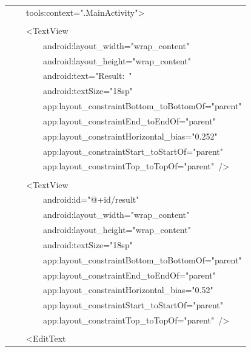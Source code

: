 \documentclass[a4paper,12pt]{article}
\begin{document}
\begin{longtable}{|p{}|}
{\ttfamily\small \ \ \ \ tools:context=".MainActivity"\textgreater{}} \\
\strut \\
{\ttfamily\small \ \ \ \ \textless{}TextView} \\
{\ttfamily\small \ \ \ \ \ \ \ \ android:layout\_width="wrap\_content"} \\
{\ttfamily\small \ \ \ \ \ \ \ \ android:layout\_height="wrap\_content"} \\
{\ttfamily\small \ \ \ \ \ \ \ \ android:text="Result:\ "} \\
{\ttfamily\small \ \ \ \ \ \ \ \ android:textSize="18sp"} \\
{\ttfamily\small \ \ \ \ \ \ \ \ app:layout\_constraintBottom\_toBottomOf="parent"} \\
{\ttfamily\small \ \ \ \ \ \ \ \ app:layout\_constraintEnd\_toEndOf="parent"} \\
{\ttfamily\small \ \ \ \ \ \ \ \ app:layout\_constraintHorizontal\_bias="0.252"} \\
{\ttfamily\small \ \ \ \ \ \ \ \ app:layout\_constraintStart\_toStartOf="parent"} \\
{\ttfamily\small \ \ \ \ \ \ \ \ app:layout\_constraintTop\_toTopOf="parent"\ /\textgreater{}} \\
\strut \\
{\ttfamily\small \ \ \ \ \textless{}TextView} \\
{\ttfamily\small \ \ \ \ \ \ \ \ android:id="@+id/result"} \\
{\ttfamily\small \ \ \ \ \ \ \ \ android:layout\_width="wrap\_content"} \\
{\ttfamily\small \ \ \ \ \ \ \ \ android:layout\_height="wrap\_content"} \\
{\ttfamily\small \ \ \ \ \ \ \ \ android:textSize="18sp"} \\
{\ttfamily\small \ \ \ \ \ \ \ \ app:layout\_constraintBottom\_toBottomOf="parent"} \\
{\ttfamily\small \ \ \ \ \ \ \ \ app:layout\_constraintEnd\_toEndOf="parent"} \\
{\ttfamily\small \ \ \ \ \ \ \ \ app:layout\_constraintHorizontal\_bias="0.52"} \\
{\ttfamily\small \ \ \ \ \ \ \ \ app:layout\_constraintStart\_toStartOf="parent"} \\
{\ttfamily\small \ \ \ \ \ \ \ \ app:layout\_constraintTop\_toTopOf="parent"\ /\textgreater{}} \\
\strut \\
{\ttfamily\small \ \ \ \ \textless{}EditText} \\

\end{longtable}
\end{document}
